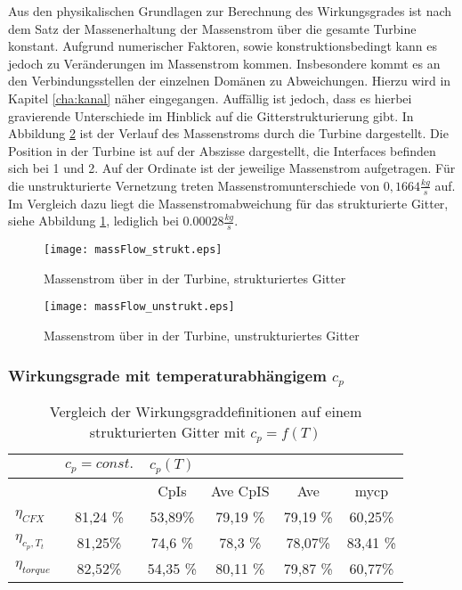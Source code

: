 Aus den physikalischen Grundlagen zur Berechnung des Wirkungsgrades ist nach dem Satz der Massenerhaltung der Massenstrom über die gesamte Turbine konstant.
Aufgrund numerischer Faktoren, sowie konstruktionsbedingt kann es jedoch zu Veränderungen im Massenstrom kommen. 
Insbesondere kommt es an den Verbindungsstellen der einzelnen Domänen zu Abweichungen. Hierzu wird in Kapitel \ref{cha:kanal} näher eingegangen.
Auffällig ist jedoch, dass es hierbei gravierende Unterschiede im Hinblick auf die Gitterstrukturierung gibt. In Abbildung \ref{fig:massFlowUnstrukt} ist der Verlauf des Massenstroms durch die Turbine dargestellt. Die Position in der Turbine ist auf der Abszisse dargestellt, die Interfaces befinden sich bei 1 und 2. Auf der Ordinate ist der jeweilige Massenstrom aufgetragen. Für die unstrukturierte Vernetzung treten Massenstromunterschiede von $0,1664 \frac{kg}{s}$ auf. Im Vergleich dazu liegt die Massenstromabweichung für das strukturierte Gitter, siehe Abbildung \ref{fig:massFlowStrukt}, lediglich bei $0.00028\frac{kg}{s}$.

 \begin{figure}[htbp]
	\centering
	\texttt{[image: massFlow\_strukt.eps]}
	\caption{Massenstrom über in der Turbine, strukturiertes Gitter} \label{fig:massFlowStrukt}
\end{figure} 
 \begin{figure}[htbp]
	\centering
	\texttt{[image: massFlow\_unstrukt.eps]}
	\caption{Massenstrom über in der Turbine, unstrukturiertes Gitter} \label{fig:massFlowUnstrukt}
\end{figure} 
\subsubsection{Wirkungsgrade mit temperaturabhängigem $c_p$}
\begin{table}[H]
	\centering
	\caption{Vergleich der Wirkungsgraddefinitionen auf einem strukturierten Gitter mit $c_p = f(T)$}
	\begin{tabular}{ l| c | c c c c}
		&	$c_p = const.$	&	$c_p(T)$	&		&		&		\\
		\hline
		&		&	CpIs	&	Ave CpIS	&	Ave	&	mycp	\\
		\hline
		$\eta_{CFX}$	&	81,24 \%	&	53,89\%	&	79,19 \%	&	79,19 \%	&	60,25\%	\\
		$\eta_{c_p, T_t}$	&	81,25\%	&	74,6 \%	&	78,3 \%	&	78,07\%	&	83,41 \%	\\
	$\eta_{torque}$	&	82,52\%	&	54,35 \%	&	80,11 \%	&	79,87 \%	&	60,77\%	\\
		
	\end{tabular}
	\label{tab:strukturiertmycp}
\end{table}

